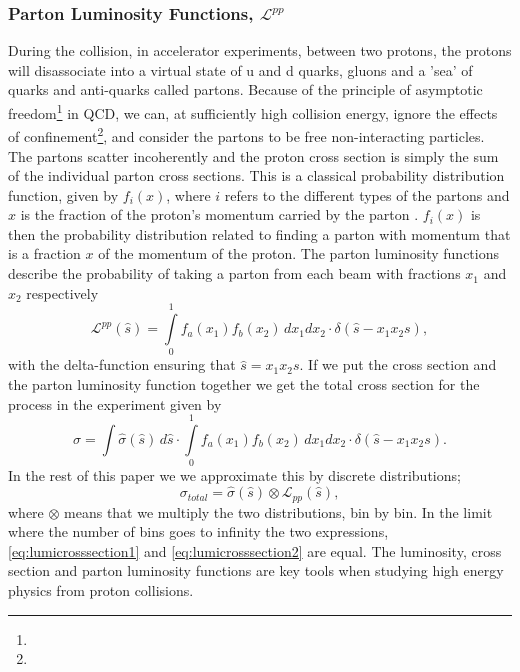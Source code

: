 \subsubsection{Parton Luminosity Functions, $\mathcal{L}^{pp}$}
During the collision, in accelerator experiments, between two protons, the protons will disassociate into a virtual state of u and d quarks, gluons and a 'sea' of quarks and anti-quarks called partons. Because of the principle of asymptotic freedom\footnote{} in QCD, we can, at sufficiently high collision energy, ignore the effects of confinement\footnote{}, and consider the partons to be free non-interacting particles. The partons scatter incoherently and the proton cross section is simply the sum of the individual parton cross sections. This is a classical probability distribution function, given by $f_{i}(x)$, where $i$ refers to the different types of the partons and $x$ is the fraction of the proton's momentum carried by the parton \cite{green2005hpp}. $f_{i}(x)$ is then the probability distribution related to finding a parton with momentum that is a fraction $x$ of the momentum of the proton. The parton luminosity functions describe the probability of taking a parton from each beam with fractions $x_{1}$ and $x_{2}$ respectively
\begin{equation}
\mathcal{L}^{pp}(\hat s)=\int\limits_{0}^{1} f_{a}(x_{1}) f_{b}(x_{2})\, dx_{1}dx_{2}\cdot \delta(\hat s - x_{1}x_{2}s),
\end{equation}
with the delta-function ensuring that $\hat s = x_{1}x_{2}s$. If we put the cross section and the parton luminosity function together we get the total cross section for the process in the experiment given by
\begin{equation} \label{eq:lumicrosssection1}
\sigma=\int \hat \sigma(\hat s) \, d \hat s \cdot \int\limits_{0}^{1} f_{a}(x_{1}) f_{b}(x_{2})\, dx_{1}dx_{2} \cdot \delta(\hat s - x_{1}x_{2}s).
\end{equation}
In the rest of this paper we we approximate this by discrete distributions;
\begin{equation} \label{eq:lumicrosssection2}
\sigma_{total}= \hat \sigma(\hat s) \otimes  \mathcal{L}_{pp}(\hat s),
\end{equation}
where $\otimes$ means that we multiply the two distributions, bin by bin. In the limit where the number of bins goes to infinity the two expressions, \eqref{eq:lumicrosssection1} and \eqref{eq:lumicrosssection2} are equal. The luminosity, cross section and parton luminosity functions are key tools when studying high energy physics from proton collisions. %